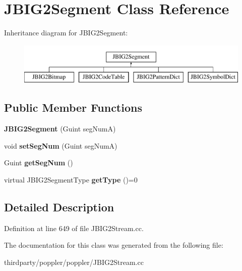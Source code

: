 \hypertarget{class_j_b_i_g2_segment}{}\section{J\+B\+I\+G2\+Segment Class Reference}
\label{class_j_b_i_g2_segment}
Inheritance diagram for J\+B\+I\+G2\+Segment\+:\begin{figure}[H]
\begin{center}
\leavevmode
\includegraphics[height=2.000000cm]{class_j_b_i_g2_segment}
\end{center}
\end{figure}
\subsection*{Public Member Functions}
\begin{DoxyCompactItemize}
\item 
\mbox{\label{class_j_b_i_g2_segment_a87b559bed17afa99adf2e4ae04542b14}} 
{\bfseries J\+B\+I\+G2\+Segment} (Guint seg\+NumA)
\item 
\mbox{\label{class_j_b_i_g2_segment_a9a6964ef83d7fa72d2235f874a6221ee}} 
void {\bfseries set\+Seg\+Num} (Guint seg\+NumA)
\item 
\mbox{\label{class_j_b_i_g2_segment_a2640fbe583bbe5693225ca35d996d888}} 
Guint {\bfseries get\+Seg\+Num} ()
\item 
\mbox{\label{class_j_b_i_g2_segment_a834de914345fc6ec654b447cd4bbeebc}} 
virtual J\+B\+I\+G2\+Segment\+Type {\bfseries get\+Type} ()=0
\end{DoxyCompactItemize}


\subsection{Detailed Description}


Definition at line 649 of file J\+B\+I\+G2\+Stream.\+cc.



The documentation for this class was generated from the following file\+:\begin{DoxyCompactItemize}
\item 
thirdparty/poppler/poppler/J\+B\+I\+G2\+Stream.\+cc\end{DoxyCompactItemize}
